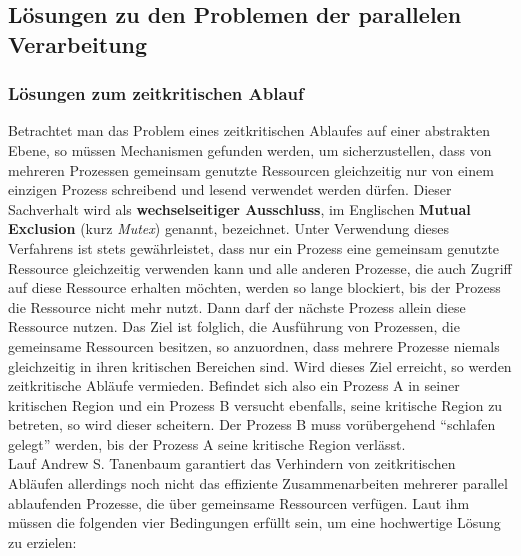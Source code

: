 		\subsection{Lösungen zu den Problemen der parallelen Verarbeitung}
		
			\subsubsection{Lösungen zum zeitkritischen Ablauf}
			
				Betrachtet man das Problem eines zeitkritischen Ablaufes auf einer abstrakten Ebene, so müssen Mechanismen gefunden werden, um sicherzustellen, dass von mehreren Prozessen gemeinsam genutzte Ressourcen gleichzeitig nur von einem einzigen Prozess schreibend und lesend verwendet werden dürfen. Dieser Sachverhalt wird als \textbf{wechselseitiger Ausschluss}, im Englischen \textbf{Mutual Exclusion} (kurz \textit{Mutex}) genannt, bezeichnet. Unter Verwendung dieses Verfahrens ist stets gewährleistet, dass nur ein Prozess eine gemeinsam genutzte Ressource gleichzeitig verwenden kann und alle anderen Prozesse, die auch Zugriff auf diese Ressource erhalten möchten, werden so lange blockiert, bis der Prozess die Ressource nicht mehr nutzt. Dann darf der nächste Prozess allein diese Ressource nutzen. Das Ziel ist folglich, die Ausführung von Prozessen, die gemeinsame Ressourcen besitzen, so anzuordnen, dass mehrere Prozesse niemals gleichzeitig in ihren kritischen Bereichen sind. Wird dieses Ziel erreicht, so werden zeitkritische Abläufe vermieden. Befindet sich also ein Prozess A in seiner kritischen Region und ein Prozess B versucht ebenfalls, seine kritische Region zu betreten, so wird dieser scheitern. Der Prozess B muss vorübergehend "`schlafen gelegt"' werden, bis der Prozess A seine kritische Region verlässt.\\
				Lauf Andrew S. Tanenbaum garantiert das Verhindern von zeitkritischen Abläufen allerdings noch nicht das effiziente Zusammenarbeiten mehrerer parallel ablaufenden Prozesse, die über gemeinsame Ressourcen verfügen. Laut ihm müssen die folgenden vier Bedingungen erfüllt sein, um eine hochwertige Lösung zu erzielen:\\
				
